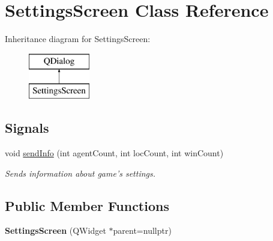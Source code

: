 \hypertarget{class_settings_screen}{\section{Settings\-Screen Class Reference}
\label{class_settings_screen}
}
Inheritance diagram for Settings\-Screen\-:\begin{figure}[H]
\begin{center}
\leavevmode
\includegraphics[height=2.000000cm]{class_settings_screen}
\end{center}
\end{figure}
\subsection*{Signals}
\begin{DoxyCompactItemize}
\item 
void \hyperlink{class_settings_screen_aa3a5d0127dacf464bdf9796283fdeb77}{send\-Info} (int agent\-Count, int loc\-Count, int win\-Count)
\begin{DoxyCompactList}\small\item\em Sends information about game's settings. \end{DoxyCompactList}\end{DoxyCompactItemize}
\subsection*{Public Member Functions}
\begin{DoxyCompactItemize}
\item 
\hypertarget{class_settings_screen_aa0ee33d1437afb512b895dd892e5e766}{{\bfseries Settings\-Screen} (Q\-Widget $\ast$parent=nullptr)}\label{class_settings_screen_aa0ee33d1437afb512b895dd892e5e766}

\end{DoxyCompactItemize}


